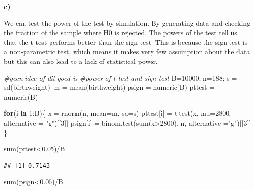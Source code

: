 \documentclass[
]{article}
\newenvironment{Shaded}{\begin{snugshade}}{\end{snugshade}}
\newcommand{\AttributeTok}[1]{\textcolor[rgb]{0.77,0.63,0.00}{#1}}
\newcommand{\CommentTok}[1]{\textcolor[rgb]{0.56,0.35,0.01}{\textit{#1}}}
\newcommand{\ControlFlowTok}[1]{\textcolor[rgb]{0.13,0.29,0.53}{\textbf{#1}}}
\newcommand{\DecValTok}[1]{\textcolor[rgb]{0.00,0.00,0.81}{#1}}
\newcommand{\FloatTok}[1]{\textcolor[rgb]{0.00,0.00,0.81}{#1}}
\newcommand{\FunctionTok}[1]{\textcolor[rgb]{0.00,0.00,0.00}{#1}}
\newcommand{\NormalTok}[1]{#1}
\newcommand{\OtherTok}[1]{\textcolor[rgb]{0.56,0.35,0.01}{#1}}
\newcommand{\SpecialCharTok}[1]{\textcolor[rgb]{0.00,0.00,0.00}{#1}}
\newcommand{\StringTok}[1]{\textcolor[rgb]{0.31,0.60,0.02}{#1}}
\begin{document}
\textbf{c)}

We can test the power of the test by simulation. By generating data and
checking the fraction of the sample where H0 is rejected. The powers of
the test tell us that the t-test performs better than the sign-test.
This is because the sign-test is a non-parametric test, which means it
makes very few assumption about the data but this can also lead to a
lack of statistical power.

\begin{Shaded}
\begin{Highlighting}[]
\CommentTok{\#geen idee of dit goed is}
\CommentTok{\#power of t{-}test and sign test}
\NormalTok{B}\OtherTok{=}\DecValTok{10000}\NormalTok{; n}\OtherTok{=}\DecValTok{188}\NormalTok{; s }\OtherTok{=} \FunctionTok{sd}\NormalTok{(birthweight); m }\OtherTok{=} \FunctionTok{mean}\NormalTok{(birthweight)}
\NormalTok{psign }\OtherTok{=} \FunctionTok{numeric}\NormalTok{(B)}
\NormalTok{pttest }\OtherTok{=} \FunctionTok{numeric}\NormalTok{(B)}

\ControlFlowTok{for}\NormalTok{(i }\ControlFlowTok{in} \DecValTok{1}\SpecialCharTok{:}\NormalTok{B)\{}
\NormalTok{  x }\OtherTok{=} \FunctionTok{rnorm}\NormalTok{(n, }\AttributeTok{mean=}\NormalTok{m, }\AttributeTok{sd=}\NormalTok{s)}
\NormalTok{  pttest[i] }\OtherTok{=} \FunctionTok{t.test}\NormalTok{(x, }\AttributeTok{mu=}\DecValTok{2800}\NormalTok{, }\AttributeTok{alternative =} \StringTok{"g"}\NormalTok{)[[}\DecValTok{3}\NormalTok{]]}
\NormalTok{  psign[i] }\OtherTok{=} \FunctionTok{binom.test}\NormalTok{(}\FunctionTok{sum}\NormalTok{(x}\SpecialCharTok{\textgreater{}}\DecValTok{2800}\NormalTok{), n, }\AttributeTok{alternative =}\StringTok{"g"}\NormalTok{)[[}\DecValTok{3}\NormalTok{]]}
\NormalTok{\}}

\FunctionTok{sum}\NormalTok{(pttest}\SpecialCharTok{\textless{}}\FloatTok{0.05}\NormalTok{)}\SpecialCharTok{/}\NormalTok{B}
\end{Highlighting}
\end{Shaded}

\begin{verbatim}
## [1] 0.7143
\end{verbatim}

\begin{Shaded}
\begin{Highlighting}[]
\FunctionTok{sum}\NormalTok{(psign}\SpecialCharTok{\textless{}}\FloatTok{0.05}\NormalTok{)}\SpecialCharTok{/}\NormalTok{B}
\end{Highlighting}
\end{Shaded}
\end{document}
